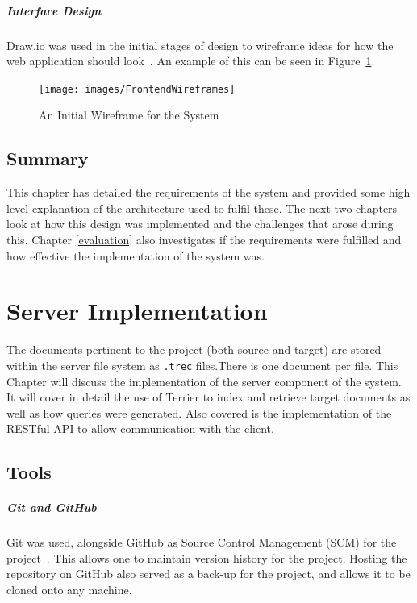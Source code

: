 \documentclass{l4proj}
\newcommand{\code}[1]{\texttt{#1}}
\begin{document}
\paragraph{Interface Design}
Draw.io was used in the initial stages of design to wireframe ideas for how the web application should look~\cite{drawio}. An example of this can be seen in Figure~\ref{wireframes}.
\begin{figure}[H]
\centering
\texttt{[image: images/FrontendWireframes]}
\caption{An Initial Wireframe for the System}
\label{wireframes}
\end{figure}

\section{Summary}
This chapter has detailed the requirements of the system and provided some high level explanation of the architecture used to fulfil these.
The next two chapters look at how this design was implemented and the challenges that arose during this. Chapter \ref{evaluation} also investigates if the requirements were fulfilled and how effective the implementation of the system was.

\chapter{Server Implementation} \label{serverimplementation}
The documents pertinent to the project (both source and target) are stored within the server file system as \code{.trec} files.There is one document per file.
This Chapter will discuss the implementation of the server component of the system. It will cover in detail the use of Terrier to index and retrieve target documents as well as how queries were generated. Also covered is the implementation of the RESTful API to allow communication with the client.

\section{Tools}
\paragraph{Git and GitHub}
Git was used, alongside GitHub as Source Control Management (SCM) for the project~\cite{git,github}. This allows one to maintain version history for the project. Hosting the repository on GitHub also served as a back-up for the project, and allows it to be cloned onto any machine.
\end{document}
